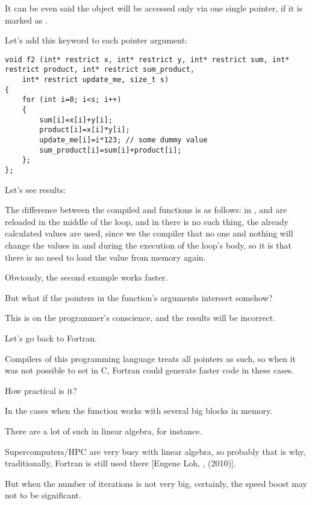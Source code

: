 It can be even said the object will be accessed
only via one single pointer, if it is marked as .

Let's add this keyword to each pointer argument:

\begin{lstlisting}[style=customc]
void f2 (int* restrict x, int* restrict y, int* restrict sum, int* restrict product, int* restrict sum_product, 
	int* restrict update_me, size_t s)
{
	for (int i=0; i<s; i++)
	{
		sum[i]=x[i]+y[i];
		product[i]=x[i]*y[i];
		update_me[i]=i*123; // some dummy value
		sum_product[i]=sum[i]+product[i];	
	};
};
\end{lstlisting}

Let's see results:





The difference between the compiled  and  functions is as follows:
in ,  and  
are reloaded in the middle of the loop,
and in  
there is no such thing,
the already calculated values are used, 
since we  the compiler 
that no one and nothing will change the values in  
and  during the execution of the loop's body, 
so it is  that there is no need to load the value from memory again.

Obviously, the second example works faster.

But what if the pointers in the function's arguments intersect somehow?

This is on the programmer's conscience, and the results will be incorrect.

Let's go back to Fortran. 

Compilers of this programming language treats all pointers as such, 
so when it was not possible to set  in C, Fortran could generate faster code in these cases.

How practical is it? 

In the cases when the function works with several big blocks in memory.

There are a lot of such in linear algebra, for instance.

Supercomputers/\ac{HPC} are very busy with linear algebra, so probably that is why, traditionally, Fortran is still
used there [Eugene Loh, , (2010)].

But when the number of iterations is not very big,
certainly, the speed boost may not to be significant.

